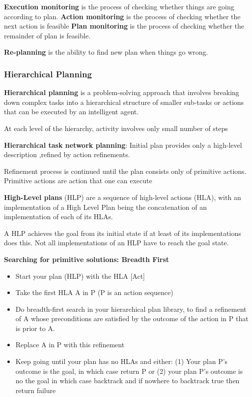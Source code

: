 \documentclass{article}
\begin{document}
 \textbf{Execution monitoring} is the process of checking whether things are going according to plan. 
 \textbf{Action monitoring} is the process of checking whether the next action is feasible 
 \textbf{Plan monitoring} is the process of checking whether the remainder of plan is feasible. 

 \textbf{Re-planning} is the ability to find new plan when things go wrong.

 \subsubsection{Hierarchical Planning}

 \textbf{Hierarchical planning} is a problem-solving approach that involves breaking down complex tasks into a hierarchical structure of smaller sub-tasks or actions that can be executed by an intelligent agent.

At each level of the hierarchy, activity involves only small number of steps

\textbf{Hierarchical task network planning}: Initial plan provides only a high-level description ,refined by action refinements. 

Refinement process is continued until the plan consists only of primitive actions. Primitive actions are action that one can execute

\textbf{High-Level plans} (HLP) are a sequence of high-level actions (HLA), with an implementation of a High Level Plan being the concatenation of an implementation of each of its HLAs.

A HLP achieves the goal from its initial state if at least of its implementations does this. Not all implementations of an HLP have to reach the goal state. 

\textbf{Searching for primitive solutions: Breadth First} \newline

\begin{itemize}
    \item Start your plan (HLP) with the HLA [Act]
    \item Take the first HLA A in P (P is an action sequence)
    \item Do breadth-first search in your hierarchical plan library, to find a refinement of A whose preconditions are satisfied by the outcome of the action in P that is prior to A. 
    \item Replace A in P with this refinement
    \item Keep going until your plan has no HLAs and either: (1) Your plan P's outcome is the goal, in which case return P or (2) your plan P's outcome is no the goal in which case backtrack and if nowhere to backtrack true then return failure
\end{itemize}
\end{document}
